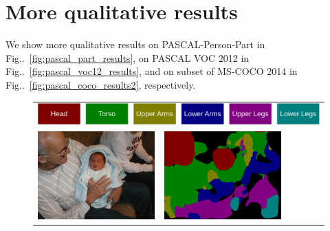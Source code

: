\documentclass[10pt,twocolumn,letterpaper]{article}
\makeatletter
\def\@onedot{\ifx\@let@token.\else.\null\fi\xspace}
\DeclareRobustCommand\onedot{\futurelet\@let@token\@onedot}
\newcommand{\figref}[1]{Fig\onedot~\ref{#1}}
\makeatother
\begin{document}
\section{More qualitative results}
We show more qualitative results on PASCAL-Person-Part \cite{chen_cvpr14} in \figref{fig:pascal_part_results}, on PASCAL VOC 2012 \cite{everingham2014pascal} in \figref{fig:pascal_voc12_results}, and on subset of MS-COCO 2014 \cite{lin2014microsoft} in \figref{fig:pascal_coco_results2}, respectively.


\begin{figure}
  \centering
  \begin{tabular}{c c c c c c}
   \multicolumn{6}{c}{\includegraphics[width=0.5\linewidth]{fig/voc10_part/legend.pdf}} \\
   \includegraphics[height=0.09\linewidth]{fig/voc10_part/img/2008_000492.jpg} &
   \includegraphics[height=0.09\linewidth]{fig/voc10_part/res_baseline/2008_000492.png} &

\end{tabular}
\end{figure}
\end{document}
